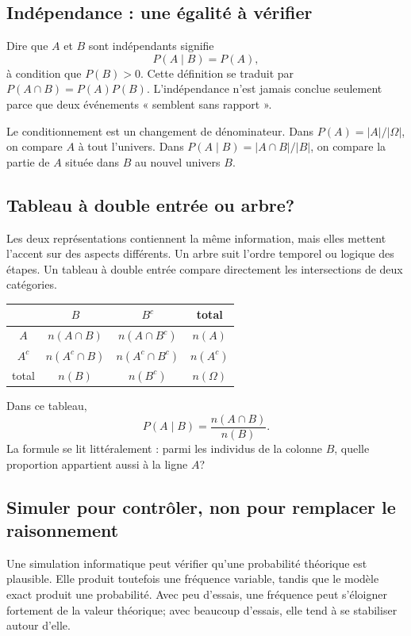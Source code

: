\documentclass[12pt,a4paper,openany]{book}
\begin{document}
\subsection{Indépendance : une égalité à vérifier}
Dire que $A$ et $B$ sont indépendants signifie
\[
P(A\mid B)=P(A),
\]
à condition que $P(B)>0$. Cette définition se traduit par $P(A\cap B)=P(A)P(B)$. L'indépendance n'est jamais conclue seulement parce que deux événements « semblent sans rapport ».

\begin{connectionbox}
Le conditionnement est un changement de dénominateur. Dans $P(A)=|A|/|\Omega|$, on compare $A$ à tout l'univers. Dans $P(A\mid B)=|A\cap B|/|B|$, on compare la partie de $A$ située dans $B$ au nouvel univers $B$.
\end{connectionbox}



\subsection{Tableau à double entrée ou arbre?}
Les deux représentations contiennent la même information, mais elles mettent l'accent sur des aspects différents. Un arbre suit l'ordre temporel ou logique des étapes. Un tableau à double entrée compare directement les intersections de deux catégories.

\begin{center}
\begin{tabular}{c|cc|c}
 & $B$ & $B^c$ & total\\\hline
$A$ & $n(A\cap B)$ & $n(A\cap B^c)$ & $n(A)$\\
$A^c$ & $n(A^c\cap B)$ & $n(A^c\cap B^c)$ & $n(A^c)$\\\hline
total & $n(B)$ & $n(B^c)$ & $n(\Omega)$
\end{tabular}
\end{center}

Dans ce tableau,
\[
P(A\mid B)=\frac{n(A\cap B)}{n(B)}.
\]
La formule se lit littéralement : parmi les individus de la colonne $B$, quelle proportion appartient aussi à la ligne $A$?

\subsection{Simuler pour contrôler, non pour remplacer le raisonnement}
Une simulation informatique peut vérifier qu'une probabilité théorique est plausible. Elle produit toutefois une fréquence variable, tandis que le modèle exact produit une probabilité. Avec peu d'essais, une fréquence peut s'éloigner fortement de la valeur théorique; avec beaucoup d'essais, elle tend à se stabiliser autour d'elle.
\end{document}
